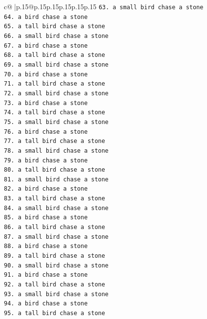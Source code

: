 \documentclass{article}
\begin{document}
{\begin{supertabular}{c@{$\;$}|p{.15\linewidth}@{}p{.15\linewidth}p{.15\linewidth}p{.15\linewidth}p{.15\linewidth}p{.15\linewidth}}
{{{\texttt{63. a small bird chase a stone} \\
\texttt{64. a bird chase a stone} \\
\texttt{65. a tall bird chase a stone} \\
\texttt{66. a small bird chase a stone} \\
\texttt{67. a bird chase a stone} \\
\texttt{68. a tall bird chase a stone} \\
\texttt{69. a small bird chase a stone} \\
\texttt{70. a bird chase a stone} \\
\texttt{71. a tall bird chase a stone} \\
\texttt{72. a small bird chase a stone} \\
\texttt{73. a bird chase a stone} \\
\texttt{74. a tall bird chase a stone} \\
\texttt{75. a small bird chase a stone} \\
\texttt{76. a bird chase a stone} \\
\texttt{77. a tall bird chase a stone} \\
\texttt{78. a small bird chase a stone} \\
\texttt{79. a bird chase a stone} \\
\texttt{80. a tall bird chase a stone} \\
\texttt{81. a small bird chase a stone} \\
\texttt{82. a bird chase a stone} \\
\texttt{83. a tall bird chase a stone} \\
\texttt{84. a small bird chase a stone} \\
\texttt{85. a bird chase a stone} \\
\texttt{86. a tall bird chase a stone} \\
\texttt{87. a small bird chase a stone} \\
\texttt{88. a bird chase a stone} \\
\texttt{89. a tall bird chase a stone} \\
\texttt{90. a small bird chase a stone} \\
\texttt{91. a bird chase a stone} \\
\texttt{92. a tall bird chase a stone} \\
\texttt{93. a small bird chase a stone} \\
\texttt{94. a bird chase a stone} \\
\texttt{95. a tall bird chase a stone} \\
}}}
\end{supertabular}}
\end{document}

